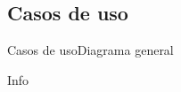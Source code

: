 %
%
%

\subsection{Casos de uso}

\begin{frame}{Casos de uso}{Diagrama general}
  
  Info


\end{frame}
